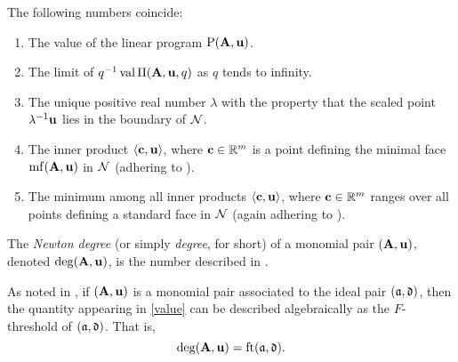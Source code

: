 \documentclass{amsart}
\begin{document}
\begin{proposition}
   \label{FT descriptions: P}
   The following numbers coincide\textup:
   \begin{enumerate}[$(1)$]
      \item\label{value} The value of the linear program $\mathrm{P}(\mathbf{A}, \mathbf{u})$.
      \item\label{limit} The limit of $q^{-1}\operatorname{val} \Pi(\mathbf{A},\mathbf{u},q)$ as $q$ tends to infinity.
      \item\label{lambda} The unique positive real number $\lambda$ with the property that the scaled point $\lambda^{-1}\mathbf{u}$ lies in the boundary of $\mathcal{N}$.
      \item\label{new ip} The inner product $\langle \mathbf{c}, \mathbf{u} \rangle$, where $\mathbf{c} \in \mathbb{R}^m$ is a point defining the minimal face $\operatorname{mf}(\mathbf{A}, \mathbf{u})$ in $\mathcal{N}$ \textup(adhering to \textup).
      \item\label{min} The minimum among all inner products $\langle \mathbf{c}, \mathbf{u} \rangle$, where $\mathbf{c} \in \mathbb{R}^m$ ranges over all points defining a standard face in $\mathcal{N}$ \textup(again adhering to \textup).
   \end{enumerate}
\end{proposition}

\begin{definition}
\label{FT: D}
   The \emph{Newton degree} (or simply \emph{degree}, for short) of a monomial pair $(\mathbf{A}, \mathbf{u})$, denoted $\operatorname{deg}(\mathbf{A},\mathbf{u})$, is the number described in .
\end{definition}

\begin{remark}
   As noted in , if $(\mathbf{A},\mathbf{u})$ is a monomial pair associated to the ideal pair $(\mathfrak{a},\mathfrak{d})$, then the quantity appearing in \ref{value} can be described algebraically as the $F$-threshold of $(\mathfrak{a},\mathfrak{d})$.
   That is,
   \[\operatorname{deg}(\mathbf{A},\mathbf{u}) = \operatorname{ft}(\mathfrak{a}, \mathfrak{d}).\]
\end{remark}
\end{document}
